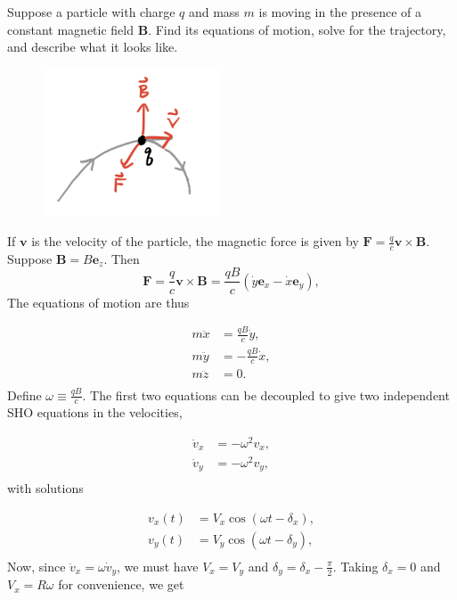 \documentclass[
  letterpaper,
  DIV=11,
  numbers=noendperiod]{scrreprt}
\begin{document}
Suppose a particle with charge \(q\) and mass \(m\) is moving in the
presence of a constant magnetic field \(\mathbf{B}\). Find its equations
of motion, solve for the trajectory, and describe what it looks like.

\begin{figure}

{\centering \includegraphics[width=2.08333in,height=\textheight]{classical-mechanics/./resources/image-20230215094609106.png}

}

\end{figure}

If \(\mathbf{v}\) is the velocity of the particle, the magnetic force is
given by \(\mathbf{F} = \frac{q}{c} \mathbf{v} \times \mathbf{B}\).
Suppose \(\mathbf{B} = B \mathbf{e}_z\). Then \[
\mathbf{F} = \frac{q}{c}\mathbf{v} \times \mathbf{B} = \frac{qB}{c}(\dot y \mathbf{e}_x - \dot x \mathbf{e}_y),
\] The equations of motion are thus

\[
\begin{align*}
m \ddot x &= \frac{qB}{c} \dot y , \\
m \ddot y &= -\frac{qB}{c} \dot x , \\
m \ddot z &=  0. \\
\end{align*}
\] Define \(\omega \equiv \frac{qB}{c}\). The first two equations can be
decoupled to give two independent SHO equations in the velocities,

\[
\begin{align*}
\ddot v_x &= -\omega^2 v_x , \\
\ddot v_y &= -\omega^2 v_y , \\
\end{align*}
\] with solutions

\[
\begin{align*}
v_x(t) &= V_x \cos(\omega t - \delta_x) , \\
v_y(t) &= V_y \cos(\omega t - \delta_y)  , \\
\end{align*}
\] Now, since \(\ddot v_x = \omega \dot v_y\), we must have
\(V_x = V_y\) and \(\delta_y = \delta_x - \frac{\pi}{2}\). Taking
\(\delta_x=0\) and \(V_x = R\omega\) for convenience, we get
\end{document}
